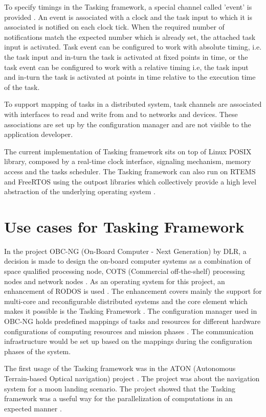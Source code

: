 To specify timings in the Tasking framework, a special channel called 'event' is provided \cite{TaskFr}. An event is associated with a clock and the task input to which it is associated is notified on each clock tick. When the required number of notifications match the expected number which is already set, the attached task input is activated. Task event can be configured to work with absolute timing, i.e. the task input and in-turn the task is activated at fixed points in time, or the task event can be configured to work with a relative timing i.e, the task input and in-turn the task is activated at points in time relative to the execution time of the task.

To support mapping of tasks in a distributed system, task channels are associated with interfaces to read and write from and to networks and devices. These associations are set up by the configuration manager and are not visible to the application developer.

The current implementation of Tasking framework sits on top of Linux POSIX library, composed by a real-time clock interface, signaling mechanism, memory access and the tasks scheduler. The Tasking framework can also run on RTEMS and FreeRTOS using the outpost libraries which collectively provide a high level abstraction of the underlying operating system \cite{TaskFr}.

\section{Use cases for Tasking Framework}
In the project OBC-NG (On-Board Computer - Next Generation) by DLR, a decision is made to design the on-board computer systems as a combination of space qualified processing node, COTS (Commercial off-the-shelf) processing nodes and network nodes \cite{TaskFr}. As an operating system for this project, an enhancement of RODOS is used \cite{TaskFr, OBC-NG}. The enhancement covers mainly the support for multi-core and reconfigurable distributed systems \cite{RODOS} and the core element which makes it possible is the Tasking Framework \cite{TaskFr}. The configuration manager used in OBC-NG holds predefined mappings of tasks and resources for different hardware configurations of computing resources and mission phases \cite{OBC-NG}. The communication infrastructure would be set up based on the mappings during the configuration phases of the system. 

The first usage of the Tasking framework was in the ATON (Autonomous Terrain-based Optical navigation) project \cite{ATON}. The project was about the navigation system for a moon landing scenario. The project showed that the Tasking framework was a useful way for the parallelization of computations in an expected manner \cite{ATON}.

